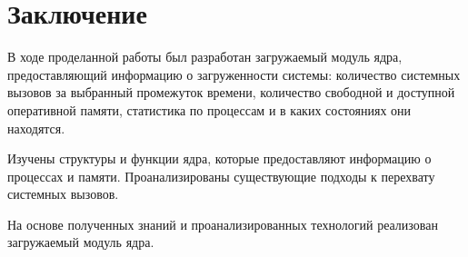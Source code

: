 \chapter*{Заключение}


В ходе проделанной работы был разработан загружаемый модуль ядра, предоставляющий информацию о загруженности системы: количество системных вызовов за выбранный промежуток времени, количество свободной и доступной оперативной памяти, статистика по процессам и в каких состояниях они находятся.

Изучены структуры и функции ядра, которые предоставляют информацию о процессах и памяти. Проанализированы существующие подходы к перехвату системных вызовов. 

На основе полученных знаний и проанализированных технологий реализован загружаемый модуль ядра.